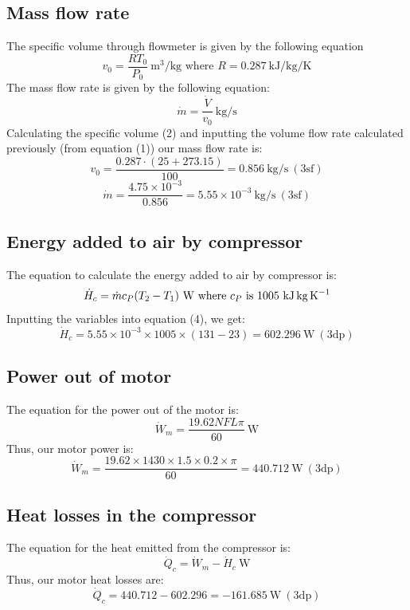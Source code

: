 \documentclass[class=article, crop=false, 12pt,a4paper]{standalone}
\begin{document}
\subsection{Mass flow rate}
The specific volume through flowmeter is given by the following equation
\begin{equation}
  v_0 = \frac{RT_0}{P_0} \ \si{\meter\cubed\per\kg} \textrm{ where \(R = 0.287 \ \si{\kilo\joule\per\kg\per\kelvin}\)}
  \label{specvol}
\end{equation}
The mass flow rate is given by the following equation:
\begin{equation}
  \dot{m} = \frac{\dot{V}}{v_0} \ \si{\kg\per\second}
  \label{massflowrate}
\end{equation}
Calculating the specific volume (2) and inputting the volume flow rate calculated previously (from equation (1)) our mass flow rate is:
\[ v_0 = \frac{0.287 \cdot (25+273.15)}{100} = 0.856 \ \si{\kg\per\second} \ (3\textrm{sf})  \]
\[ \dot{m} = \frac{4.75 \times 10^{-3}}{0.856} = 5.55 \times 10^{-3} \ \si{\kg\per\second} \ (3\textrm{sf}) \]
\subsection{Energy added to air by compressor}
The equation to calculate the energy added to air by compressor is:
\begin{equation}
  \dot{H}_c = \dot{m}c_P(T_2-T_1) \ \si{\watt} \textrm{ where \(c_P\) is 1005 \si{\kilo\joule\kg\per\kelvin}}
  \label{energyaddaircompressor}
\end{equation}
Inputting the variables into equation (4), we get: 
\[ \dot{H}_c = 5.55 \times 10^{-3} \times 1005 \times (131-23) = 602.296 \ \si{\watt} \ (3\textrm{dp}) \]
\subsection{Power out of motor}
The equation for the power out of the motor is:
\begin{equation}
  \dot{W}_{m} = \frac{19.62NFL\pi}{60} \ \si{\watt}
  \label{motorpower}
\end{equation}
Thus, our motor power is:
\[ \dot{W}_{m} = \frac{19.62 \times 1430 \times 1.5 \times 0.2 \times \pi}{60} = 440.712 \ \si{\watt} \ (3\textrm{dp}) \]
\subsection{Heat losses in the compressor}
The equation for the heat emitted from the compressor is:
\begin{equation}
  \dot{Q}_c = \dot{W}_m - \dot{H}_c \ \si{\watt}
  \label{heatlosscompressor}
\end{equation}
Thus, our motor heat losses are:
\[ \dot{Q}_c = 440.712 - 602.296 = -161.685 \ \si{\watt} \ (3\textrm{dp}) \]
\end{document}
